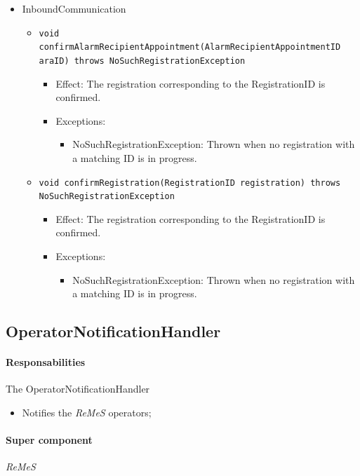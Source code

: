 \documentclass[a4paper,10pt]{article}
\newcommand{\rem}{\emph{ReMeS}\xspace}
\begin{document}
\begin{itemize}
    \item InboundCommunication
    \begin{itemize}
    	 \item \texttt{void confirmAlarmRecipientAppointment(AlarmRecipientAppointmentID araID) throws NoSuchRegistrationException}
        \begin{itemize}
            \item Effect: The registration corresponding to the RegistrationID is confirmed.
            \item Exceptions:
            	\begin{itemize}
                	\item NoSuchRegistrationException: Thrown when no registration with a matching ID is in progress.
                \end{itemize}
        \end{itemize}
        
    	\item \texttt{void confirmRegistration(RegistrationID registration) throws NoSuchRegistrationException}
        \begin{itemize}
            \item Effect: The registration corresponding to the RegistrationID is confirmed.
            \item Exceptions:
            	\begin{itemize}
                	\item NoSuchRegistrationException: Thrown when no registration with a matching ID is in progress.
                \end{itemize}
        \end{itemize}
    \end{itemize}
\end{itemize}

\subsection{OperatorNotificationHandler}
\paragraph{Responsabilities} 
The OperatorNotificationHandler
\begin{itemize}
	\item Notifies the \rem operators;
\end{itemize}

\paragraph{Super component} \rem
\end{document}
